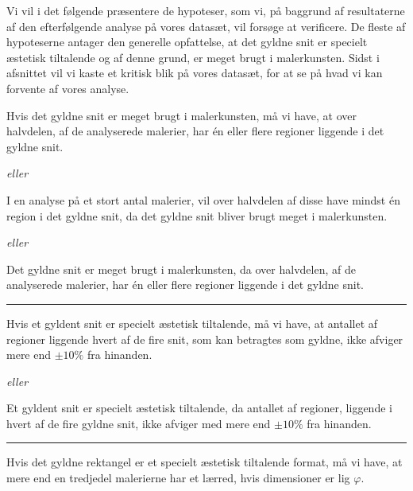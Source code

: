 {
{\sffamily Vi vil i det følgende præsentere de hypoteser, som vi, på
baggrund af resultaterne af den efterfølgende analyse på vores datasæt,
vil forsøge at verificere. De fleste af hypoteserne antager den
generelle opfattelse, at det gyldne snit er specielt æstetisk tiltalende
og af denne grund, er meget brugt i malerkunsten. Sidst i afsnittet vil
vi kaste et kritisk blik på vores datasæt, for at se på hvad vi kan
forvente af vores analyse.
}

\begin{hypotese}
    Hvis det gyldne snit er meget brugt i malerkunsten, må vi have, at
    over halvdelen, af de analyserede malerier, har én eller flere
    regioner liggende i det gyldne snit.
\end{hypotese}

\emph{eller}

\begin{hypotese}
    I en analyse på et stort antal malerier, vil over halvdelen af disse
    have mindst én region i det gyldne snit, da det gyldne snit bliver
    brugt meget i malerkunsten.
\end{hypotese}

\emph{eller}

\begin{hypotese}
    Det gyldne snit er meget brugt i malerkunsten, da over halvdelen, af
    de analyserede malerier, har én eller flere regioner liggende i det
    gyldne snit.
    \label{hypo_binaer}
\end{hypotese}

\hrule

\begin{hypotese}
    Hvis et gyldent snit er specielt æstetisk tiltalende, må vi have, at
    antallet af regioner liggende hvert af de fire snit, som kan
    betragtes som gyldne, ikke afviger mere end $\pm10\%$ fra hinanden.
\end{hypotese}

\emph{eller}

\begin{hypotese}
    Et gyldent snit er specielt æstetisk tiltalende, da antallet af
    regioner, liggende i hvert af de fire gyldne snit, ikke afviger med
    mere end $\pm10\%$ fra hinanden.
\end{hypotese}

\hrule

\begin{hypotese}
    Hvis det gyldne rektangel er et specielt æstetisk tiltalende format,
    må vi have, at mere end en tredjedel malerierne har et lærred, hvis
    dimensioner er lig $\varphi$.
\end{hypotese}

}
